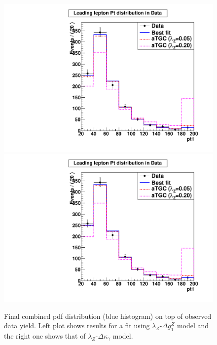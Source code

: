 \begin{figure}[tp]
  \centering
    \includegraphics[width=.45\textwidth]{figures/lz_dgz_pdf_data}
    \includegraphics[width=.45\textwidth]{figures/lz_dkg_pdf_data}

  \caption[Fit on data] {Final combined pdf distribution (blue
  histogram) on top of observed data yield. Left plot shows results
  for a fit using $\lambda_Z$-$\Delta g^Z_1$ model and the right one
  shows that of $\lambda_Z$-$\Delta\kappa_{\gamma}$ model.} \label{fig:fit_data}
\end{figure}
